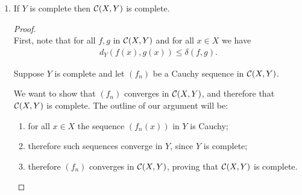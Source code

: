 \documentclass[12pt]{article}
\begin{document}
\begin{enumerate}[label=(\roman*)]
\begin{proof}
\begin{enumerate}
\begin{proof}
        Note that since $d_Y$ is a metric, we have for all $x \in X$
        \begin{align*}
          d_Y\(f(x), g(x)\) + d_Y\(g(x), h(x)\) \geq d_Y\(f(x), h(x)\).
        \end{align*}
        Therefore
        \begin{align*}
          \limn \Big(d_Y\(f(x_n), g(x_n)\) + d_Y\(g(x_n), h(x_n)\)\Big) \geq \delta(f, h).
        \end{align*}
        But
        \begin{align*}
          & \limn \Big(d_Y\(f(x_n), g(x_n)\) + d_Y\(g(x_n), h(x_n)\)\Big) \\
          =& \limn d_Y\(f(x_n), g(x_n)\) + \limn  d_Y\(g(x_n), h(x_n)\) \\
          \leq& \sup_{x\in X} d_Y\(f(x), g(x)\) + \sup_{x\in X} d_Y\(g(x), h(x)\) \\
          =& ~\delta(f, g) + \delta(g, h).
        \end{align*}
        Therefore $\delta(f, g) + \delta(g, h) \geq \delta(f, h)$.
      \end{proof}
    \end{enumerate}
  \end{proof}
\newpage
\item
  \begin{claim*}
    If $Y$ is complete then $\mathcal{C}(X, Y)$ is complete.
  \end{claim*}
  \begin{proof}~\\
    First, note that for all $f, g$ in $\mathcal{C}(X, Y)$ and for all $x \in X$ we have
    \begin{align*}
      d_Y(f(x), g(x)) \leq \delta(f, g).
    \end{align*}

    Suppose $Y$ is complete and let $(f_n)$ be a Cauchy sequence in $\mathcal{C}(X, Y)$.

    We want to show that $(f_n)$ converges in $\mathcal{C}(X, Y)$, and therefore that $\mathcal{C}(X, Y)$ is
    complete. The outline of our argument will be:
    \begin{enumerate}
    \item for all $x \in X$ the sequence $(f_n(x))$ in $Y$ is Cauchy;
    \item therefore such sequences converge in $Y$, since $Y$ is complete;
    \item therefore $(f_n)$ converges in $\mathcal{C}(X, Y)$, proving that $\mathcal{C}(X, Y)$ is complete.
    \end{enumerate}


\end{proof}
\end{enumerate}
\end{document}
